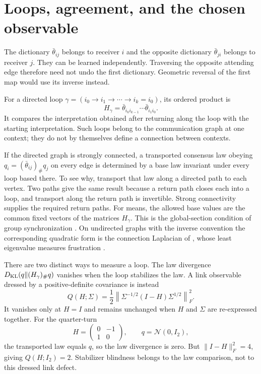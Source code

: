 \section{Loops, agreement, and the chosen observable}

The dictionary $\bar\theta_{ij}$ belongs to receiver $i$ and the opposite dictionary $\bar\theta_{ji}$ belongs to receiver $j$. They can be learned independently. Traversing the opposite attending edge therefore need not undo the first dictionary. Geometric reversal of the first map would use its inverse instead.

For a directed loop $\gamma=(i_0\to i_1\to\cdots\to i_k=i_0)$, its ordered product is
\begin{equation}
H_\gamma=\bar\theta_{i_ki_{k-1}}\cdots\bar\theta_{i_1i_0}.
\end{equation}
It compares the interpretation obtained after returning along the loop with the starting interpretation. Such loops belong to the communication graph at one context; they do not by themselves define a connection between contexts.

If the directed graph is strongly connected, a transported consensus law obeying $q_i=(\bar\theta_{ij})_\#q_j$ on every edge is determined by a base law invariant under every loop based there. To see why, transport that law along a directed path to each vertex. Two paths give the same result because a return path closes each into a loop, and transport along the return path is invertible. Strong connectivity supplies the required return paths. For means, the allowed base values are the common fixed vectors of the matrices $H_\gamma$. This is the global-section condition of group synchronization \citep{Singer2011}. On undirected graphs with the inverse convention the corresponding quadratic form is the connection Laplacian of \citet{SingerWu2012}, whose least eigenvalue measures frustration \citep{BandeiraSingerSpielman2013}.

There are two distinct ways to measure a loop. The law divergence $D_{\mathrm{KL}}(q\Vert(H_\gamma)_\#q)$ vanishes when the loop stabilizes the law. A link observable dressed by a positive-definite covariance is instead
\begin{equation}
Q(H;\Sigma)
=\frac12\left\|\Sigma^{-1/2}(I-H)\Sigma^{1/2}\right\|_F^2.
\label{c17:loop-defect}
\end{equation}
It vanishes only at $H=I$ and remains unchanged when $H$ and $\Sigma$ are re-expressed together. For the quarter-turn
\begin{equation}
H=\begin{pmatrix}0&-1\\1&0\end{pmatrix},\qquad q=\mathcal N(0,I_2),
\end{equation}
the transported law equals $q$, so the law divergence is zero. But $\|I-H\|_F^2=4$, giving $Q(H;I_2)=2$. Stabilizer blindness belongs to the law comparison, not to this dressed link defect.

